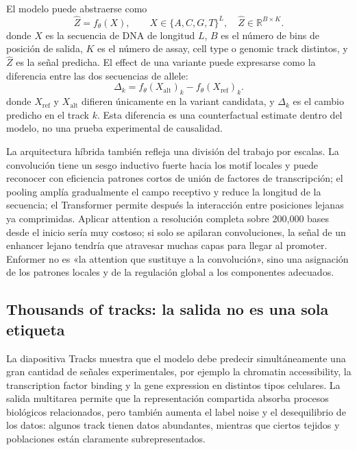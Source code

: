 

El modelo puede abstraerse como
$$
\hat Z=f_{\theta}(X),\qquad
X\in\{A,C,G,T\}^{L},\quad
\hat Z\in\mathbb{R}^{B\times K}.
$$
donde $X$ es la secuencia de DNA de longitud $L$, $B$ es el número de bins de posición de salida, $K$ es el número de assay, cell type o genomic track distintos, y $\hat Z$ es la señal predicha. El effect de una variante puede expresarse como la diferencia entre las dos secuencias de allele:
$$
\Delta_k=f_{\theta}(X_{\text{alt}})_k-f_{\theta}(X_{\text{ref}})_k.
$$
donde $X_{\text{ref}}$ y $X_{\text{alt}}$ difieren únicamente en la variant candidata, y $\Delta_k$ es el cambio predicho en el track $k$. Esta diferencia es una counterfactual estimate dentro del modelo, no una prueba experimental de causalidad.

La arquitectura híbrida también refleja una división del trabajo por escalas. La convolución tiene un sesgo inductivo fuerte hacia los motif locales y puede reconocer con eficiencia patrones cortos de unión de factores de transcripción; el pooling amplía gradualmente el campo receptivo y reduce la longitud de la secuencia; el Transformer permite después la interacción entre posiciones lejanas ya comprimidas. Aplicar attention a resolución completa sobre 200,000 bases desde el inicio sería muy costoso; si solo se apilaran convoluciones, la señal de un enhancer lejano tendría que atravesar muchas capas para llegar al promoter. Enformer no es «la attention que sustituye a la convolución», sino una asignación de los patrones locales y de la regulación global a los componentes adecuados.

\subsection{Thousands of tracks: la salida no es una sola etiqueta}

La diapositiva Tracks muestra que el modelo debe predecir simultáneamente una gran cantidad de señales experimentales, por ejemplo la chromatin accessibility, la transcription factor binding y la gene expression en distintos tipos celulares. La salida multitarea permite que la representación compartida absorba procesos biológicos relacionados, pero también aumenta el label noise y el desequilibrio de los datos: algunos track tienen datos abundantes, mientras que ciertos tejidos y poblaciones están claramente subrepresentados.

